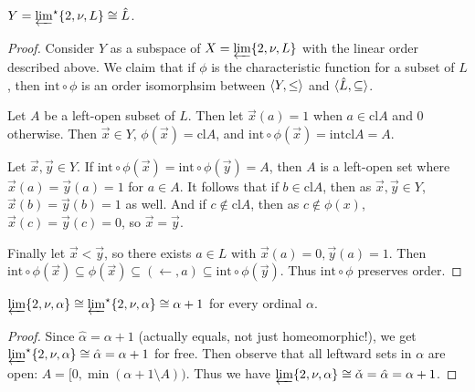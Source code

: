 \documentclass[11pt]{article}
\renewcommand{\int}{\textrm{int}}
\renewcommand{\cl}{\textrm{cl}}
\newcommand{\lexTimes}{\times_{\textrm{lex}}}
\begin{document}
  \begin{theorem}
    \(Y=\varprojlim^\star \{2, \nu, L\}\cong \hat L\).
  \end{theorem}

  \begin{proof}
    Consider \(Y\) as a subspace of \(X=\varprojlim \{2, \nu, L\}\) with
    the linear order described above. We claim that if \(\phi\) is the
    characteristic function for a subset of \(L\), then \(\int\circ\phi\)
    is an order isomorphsim between \(\langle Y,\leq\rangle\) and
    \(\langle\hat L,\subseteq\rangle\).

    Let \(A\) be a left-open subset of \(L\). Then let \(\vec x(a)=1\) when
    \(a\in\cl A\) and \(0\) otherwise. Then \(\vec x\in Y\),
    \(\phi(\vec x)=\cl A\), and \(\int\circ\phi(\vec x)=\int\cl A=A\).

    Let \(\vec x,\vec y\in Y\). If
    \(\int\circ\phi(\vec x)=\int\circ\phi(\vec y)=A\), then \(A\) is a
    left-open set where \(\vec x(a)=\vec y(a)=1\) for \(a\in A\). It follows
    that if \(b\in\cl A\), then as \(\vec x,\vec y\in Y\),
    \(\vec x(b)=\vec y(b)=1\) as well. And if \(c\not\in\cl A\), then
    as \(c\not\in\phi(x)\),
    \(\vec x(c)=\vec y(c)=0\), so \(\vec x=\vec y\).

    Finally let \(\vec x<\vec y\), so there exists \(a\in L\) with
    \(\vec x(a)=0,\vec y(a)=1\). Then
    \(
      \int\circ\phi(\vec x)
        \subseteq
      \phi(\vec x)
        \subseteq
      (\leftarrow,a)
        \subseteq
      \int\circ\phi(\vec y)
    \). Thus \(\int\circ\phi\) preserves order.
  \end{proof}

  \begin{corollary}
    \(
      \varprojlim \{2, \nu, \alpha\}
      \cong
      \varprojlim^\star \{2, \nu, \alpha\}
      \cong
      \alpha+1
    \)
    for every ordinal \(\alpha\).
  \end{corollary}

  \begin{proof}
    Since \(\hat\alpha=\alpha+1\) (actually equals, not just homeomorphic!),
    we get \(\varprojlim^\star \{2, \nu, \alpha\}
      \cong \hat\alpha =
    \alpha+1\) for free. Then observe that all leftward sets in \(\alpha\) are
    open: \(A=[0,\min(\alpha+1\setminus A))\).
    Thus we have
    \(\varprojlim \{2, \nu, \alpha\}\cong\check\alpha=\hat\alpha=\alpha+1\).
  \end{proof}



\newpage


\end{document}

